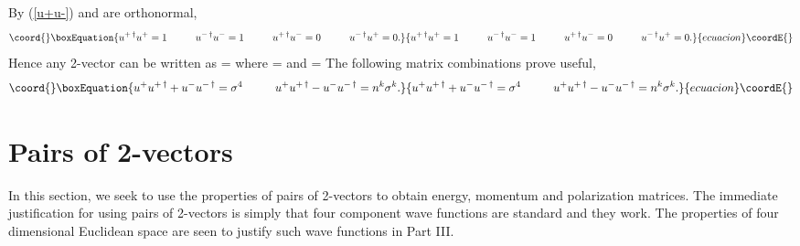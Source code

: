 \documentclass[a4paper,12pt]{article}
\begin{document}
By (\ref{u+u-}) \coordHE{} and \coordHE{} are orthonormal, 
\begin{equation}\coord{}\boxEquation{ \label{ortho,u+u-}
u^{+ \, \dagger} u^{+} = 1 \hspace{1.0cm}  u^{- \, \dagger} u^{-} = 1 \hspace{1.0cm} u^{+ \, \dagger} u^{-} = 0 \hspace{1.0cm} u^{- \, \dagger} u^{+} = 0.}{ u^{+ \, \dagger} u^{+} = 1 \hspace{1.0cm}  u^{- \, \dagger} u^{-} = 1 \hspace{1.0cm} u^{+ \, \dagger} u^{-} = 0 \hspace{1.0cm} u^{- \, \dagger} u^{+} = 0.}{ecuacion}\coordE{}\end{equation}
Hence any 2-vector \coordHE{} can be written as \coordHE{} = \coordHE{} where \coordHE{} = \coordHE{} and \coordHE{} = \coordHE{} The following matrix combinations prove useful,
\begin{equation}\coord{}\boxEquation{ \label{u+u+dagger}
 u^{+} u^{+ \, \dagger} + u^{-}u^{- \, \dagger} = \sigma^{4} \hspace{1.0cm}   u^{+} u^{+ \, \dagger} - u^{-}u^{- \, \dagger} = n^{k} \sigma^{k} .
}{ u^{+} u^{+ \, \dagger} + u^{-}u^{- \, \dagger} = \sigma^{4} \hspace{1.0cm}   u^{+} u^{+ \, \dagger} - u^{-}u^{- \, \dagger} = n^{k} \sigma^{k} .
}{ecuacion}\coordE{}\end{equation}



\section{Pairs of 2-vectors} \label{pairs} %

	In this section, we seek to use the properties of pairs of 2-vectors to obtain energy, momentum and polarization matrices. The immediate justification for using pairs of 2-vectors is simply that four component wave functions are standard and they work. The properties of four dimensional Euclidean space are seen to justify such wave functions in Part III. 
\end{document}
